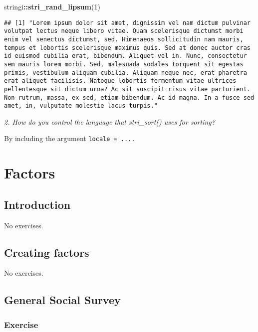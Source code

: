 \documentclass[]{article}
\newenvironment{Shaded}{\begin{snugshade}}{\end{snugshade}}
\newcommand{\KeywordTok}[1]{\textcolor[rgb]{0.13,0.29,0.53}{\textbf{#1}}}
\newcommand{\DecValTok}[1]{\textcolor[rgb]{0.00,0.00,0.81}{#1}}
\newcommand{\OperatorTok}[1]{\textcolor[rgb]{0.81,0.36,0.00}{\textbf{#1}}}
\newcommand{\NormalTok}[1]{#1}
\theoremstyle{definition}
\theoremstyle{definition}
\theoremstyle{definition}
\theoremstyle{remark}
\begin{document}
\begin{Shaded}
\begin{Highlighting}[]
\NormalTok{stringi}\OperatorTok{::}\KeywordTok{stri_rand_lipsum}\NormalTok{(}\DecValTok{1}\NormalTok{)}
\end{Highlighting}
\end{Shaded}

\begin{verbatim}
## [1] "Lorem ipsum dolor sit amet, dignissim vel nam dictum pulvinar volutpat lectus neque libero vitae. Quam scelerisque dictumst morbi enim vel senectus dictumst, sed. Himenaeos sollicitudin nam mauris, tempus et lobortis scelerisque maximus quis. Sed at donec auctor cras id euismod cubilia erat, bibendum. Aliquet vel in. Nunc, consectetur sem mauris lorem morbi. Sed, malesuada sodales torquent sit egestas primis, vestibulum aliquam cubilia. Aliquam neque nec, erat pharetra erat aliquet facilisis. Natoque lobortis fermentum vitae ultrices pellentesque sit dictum urna? Ac sit suscipit risus vitae parturient. Non rutrum, massa, ex sed, etiam bibendum. Ac id magna. In a fusce sed amet, in, vulputate molestie lacus turpis."
\end{verbatim}

\emph{2. How do you control the language that stri\_sort() uses for
sorting?}

By including the argument \texttt{locale\ =\ ....}

\section{Factors}\label{factors}

\subsection{Introduction}\label{introduction-11}

No exercises.

\subsection{Creating factors}\label{creating-factors}

No exercises.

\subsection{General Social Survey}\label{general-social-survey}

\subsubsection{Exercise}\label{exercise}
\end{document}
